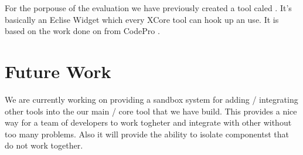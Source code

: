         For the porpouse of the evaluation we have previously created a tool caled . It's basically an Eclise Widget which 
every XCore tool can hook up an use. It is based on the work done on  from CodePro \cite{tools:inCode}.

\section{Future Work}

        We are currently working on providing a sandbox system for adding / integrating other tools into the our main / core tool that we have build. 
This provides a nice way for a team of developers to work togheter and integrate with other without too many problems. Also it will provide the ability
to isolate componentst that do not work together. 
